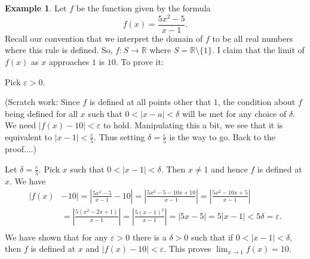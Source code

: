 \documentclass[12pt]{amsart}
\def\d{\delta}
\def\e{\varepsilon}
\newcommand{\R}{{\mathbb{R}}}
\numberwithin{equation}{section}
\theoremstyle{plain} %
\theoremstyle{definition}
\newtheorem{ex}[equation]{Example}
\theoremstyle{remark}
\begin{document}
\begin{ex} Let $f$ be the function given by the formula
$$
 f(x) = \frac{5x^2-5}{x-1}.
$$
Recall our convention that we interpret the domain of $f$ to be all real numbers where this rule is defined. So, $f: S \to \R$ where $S = \R \setminus \{1\}$. I claim that the limit of $f(x)$  as $x$ approaches $1$ is $10$. To prove it:

Pick $\e > 0$.

(Scratch work: Since $f$ is defined at all points other that $1$, the condition about $f$ being defined for all $x$ such that $0 < |x-a| < \d$ will be  met for any choice of $\delta$. 
We need $|f(x) - 10| < \e$ to
hold. Manipulating this a bit, we see that it is equivalent to $|x-1|  < \frac{\e}{5}$. Thus setting $\d = \frac{\e}{5}$ is the way to go. Back to the proof....)

Let $\d = \frac{\e}{5}$. Pick $x$ such that $0 < |x-1| < \d$. Then $x \ne 1$ and hence $f$ is defined at $x$. We have
$$
\begin{aligned}
|f(x) &- 10|  =  \left|\frac{5x^2-5}{x-1} - 10\right|=  \left|\frac{5x^2-5-10x+10}{x-1}\right|  =  \left|\frac{5x^2-10x + 5}{x-1}\right| \\ 
& =  \left|\frac{5(x^2-2x +1)}{x-1}\right| =  \left|\frac{5(x-1)^2 }{x-1}\right|  =  |5x-5|  =  5|x-1| < 5 \d  = \e. \\
\end{aligned}
$$
We have shown that for any $\e>0$ there is a $\d>0$ such that 
if $0 < |x-1|< \d$, then $f$ is defined at $x$ and $|f(x) - 10| < \e$. This proves $\lim_{x \to 1} f(x) = 10$.  
\end{ex}


\end{document}
